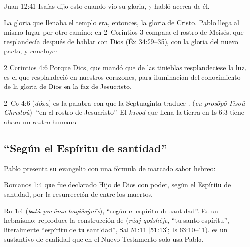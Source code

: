 \begin{verso}{Juan 12:41}
Isaías dijo esto cuando vio su gloria, y habló acerca de él.
\end{verso}

La gloria que llenaba el templo era, entonces, la gloria de Cristo. Pablo llega al mismo lugar por otro camino: en 2~Corintios 3 compara el rostro de Moisés, que resplandecía después de hablar con Dios (Éx 34:29--35), con la gloria del nuevo pacto, y concluye:

\begin{verso}{2 Corintios 4:6}
Porque Dios, que mandó que de las tinieblas resplandeciese la luz, es el que resplandeció en nuestros corazones, para iluminación del conocimiento de la gloria de Dios en la faz de Jesucristo.
\end{verso}

\begin{filologiatexto}{2~Co 4:6}
 (\emph{dóxa}) es la palabra con que la Septuaginta traduce .  (\emph{en prosōpō Iēsoû Christoû}): ``en el rostro de Jesucristo''. El \emph{kavod} que llena la tierra en Is 6:3 tiene ahora un rostro humano.
\end{filologiatexto}


\subsection{“Según el Espíritu de santidad”}
Pablo presenta su evangelio con una fórmula de marcado sabor hebreo:

\begin{verso}{Romanos 1:4}
que fue declarado Hijo de Dios con poder, según el Espíritu de santidad, por la resurrección de entre los muertos.
\end{verso}

\begin{filologiatexto}{Ro 1:4}
 (\emph{katà pneûma hagiōsýnēs}), ``según el espíritu de santidad''. Es un hebraísmo: reproduce la construcción de  (\emph{rúaj qodshéja}, ``tu santo espíritu'', literalmente ``espíritu de tu santidad'', Sal 51:11 [51:13]; Is 63:10--11).  es un sustantivo de cualidad que en el Nuevo Testamento solo usa Pablo.
\end{filologiatexto}

